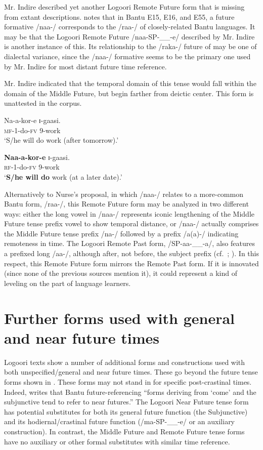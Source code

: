 \documentclass[output=paper]{langsci/langscibook}
\begin{document}
Mr. Indire described yet another Logoori Remote Future form that is missing from extant descriptions. \citet[86, fn c]{Nurse2008} notes that in Bantu E15, E16, and E55, a future formative /naa-/ corresponds to the /raa-/ of closely-related Bantu languages. It may be that the Logoori Remote Future /naa-SP-\_\_-e/ described by Mr. Indire is another instance of this. Its relationship to the /raka-/ future of  may be one of dialectal variance, since the /naa-/ formative seems to be the primary one used by Mr. Indire for most distant future time reference.

Mr. Indire indicated that the temporal domain of this tense would fall within the domain of the Middle Future, but begin farther from deictic center. This form is unattested in the corpus.

\ea\label{ex:sarvasy:16}
\gll Na-a-kor-e  ɪ-gaasi. \\
\textsc{mf}-1-do-\textsc{fv}  9-work \\
\glt ‘S/he will do work (after tomorrow).’
\z 

\ea\label{ex:sarvasy:17}
\gll \textbf{Naa-a-kor-e}  ɪ-gaasi. \\
\textsc{rf}-1-do-\textsc{fv}  9-work \\
\glt ‘\textbf{S/he will do} work (at a later date).’
\z

Alternatively to Nurse’s proposal, in which /naa-/ relates to a more-common Bantu form, /raa-/, this Remote Future form may be analyzed in two different ways: either the long vowel in /naa-/ represents iconic lengthening of the Middle Future tense prefix vowel to show temporal distance, or /naa-/ actually comprises the Middle Future tense prefix /na-/ followed by a prefix /a(a)-/ indicating remoteness in time. The Logoori Remote Past form, /SP-aa-\_\_-a/, also features a prefixed long /aa-/, although after, not before, the subject prefix (cf.\ \citealt[206]{Mould1981}; \citealt[323]{Leung1991}). In this respect, this Remote Future form mirrors the Remote Past form. If it is innovated (since none of the previous sources mention it), it could represent a kind of leveling on the part of language learners.

\section[Further forms used with general and near future times]{Further forms used with general and near future times}
\label{sec:sarvasy:7}

Logoori texts show a number of additional forms and constructions used with both unspecified/general and near future times. These go beyond the future tense forms shown in . These forms may not stand in for specific post-crastinal times. Indeed, \citet[85]{Nurse2008} writes that Bantu future-referencing “forms deriving from ‘come’ and the subjunctive tend to refer to near futures.” The Logoori Near Future tense form has potential substitutes for both its general future function (the Subjunctive) and its hodiernal/crastinal future function (/ma-SP-\_\_-e/ or an auxiliary construction). In contrast, the Middle Future and Remote Future tense forms have no auxiliary or other formal substitutes with similar time reference.
\end{document}
